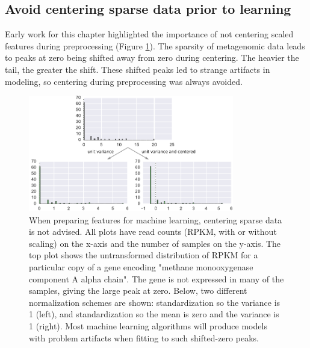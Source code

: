 \subsection{Avoid centering sparse data prior to learning}
\label{sect:centering_sparse}
Early work for this chapter highlighted the importance of not centering scaled features during preprocessing (Figure \ref{fig:standard_scaler}).
The sparsity of metagenomic data leads to peaks at zero being shifted away from zero during centering. %
The heavier the tail, the greater the shift. %
These shifted peaks led to strange artifacts in modeling, so centering during preprocessing was always avoided.

\begin{figure}[H]
\centering
    \includegraphics[width=0.8\textwidth]{./tex/chapter3/figures/170324_standard_scalar.pdf}
    \begin{singlespace}
    \caption[Feature scaling: centering sparse features is not advised]{
        When preparing features for machine learning, centering sparse data is not advised.
        All plots have read counts (RPKM, with or without scaling) on the x-axis and the number of samples on the y-axis.
        The top plot shows the untransformed distribution of RPKM for a particular copy of a gene encoding
            "methane monooxygenase component A alpha chain".
        The gene is not expressed in many of the samples, giving the large peak at zero.
        Below, two different normalization schemes are shown:
            standardization so the variance is 1 (left), and
            standardization so the mean is zero and the variance is 1 (right).
        Most machine learning algorithms will produce models with problem artifacts when fitting to such shifted-zero peaks.
        }
    \label{fig:standard_scaler}
    \end{singlespace}
\end{figure}


